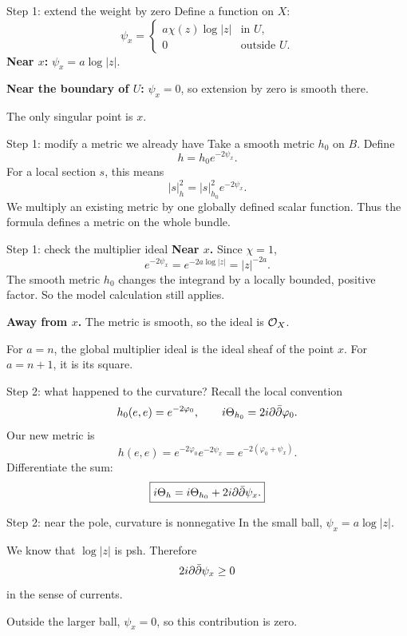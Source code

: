 \begin{frame}{Step 1: extend the weight by zero}
Define a function on \(X\):
\[
\psi_x=\begin{cases}
a\chi(z)\log|z|&\text{in }U,\\
0&\text{outside }U.
\end{cases}
\]
\textbf{Near \(x\):} \(\psi_x=a\log|z|\).
\par\medskip
\textbf{Near the boundary of \(U\):} \(\psi_x=0\), so extension by zero is smooth there.
\par\medskip
The only singular point is \(x\).
\end{frame}

\begin{frame}{Step 1: modify a metric we already have}
Take a smooth metric \(h_0\) on \(B\). Define
\[
\boxed{h=h_0e^{-2\psi_x}.}
\]
For a local section \(s\), this means
\[
|s|_h^2=|s|_{h_0}^2e^{-2\psi_x}.
\]
We multiply an existing metric by one globally defined scalar function. Thus the formula defines a metric on the whole bundle.
\end{frame}

\begin{frame}{Step 1: check the multiplier ideal}
\textbf{Near \(x\).} Since \(\chi=1\),
\[
e^{-2\psi_x}=e^{-2a\log|z|}=|z|^{-2a}.
\]
The smooth metric \(h_0\) changes the integrand by a locally bounded, positive factor. So the model calculation still applies.
\par\medskip
\textbf{Away from \(x\).} The metric is smooth, so the ideal is \(\mathcal O_X\).
\par\medskip
For \(a=n\), the global multiplier ideal is the ideal sheaf of the point \(x\). For \(a=n+1\), it is its square.
\end{frame}

\begin{frame}{Step 2: what happened to the curvature?}
Recall the local convention
\[
h_0(e,e)=e^{-2\varphi_0},\qquad i\Theta_{h_0}=2i\partial\bar\partial\varphi_0.
\]
Our new metric is
\[
h(e,e)=e^{-2\varphi_0}e^{-2\psi_x}=e^{-2(\varphi_0+\psi_x)}.
\]
Differentiate the sum:
\[
\boxed{i\Theta_h=i\Theta_{h_0}+2i\partial\bar\partial\psi_x.}
\]
\end{frame}

\begin{frame}{Step 2: near the pole, curvature is nonnegative}
In the small ball, \(\psi_x=a\log|z|\).
\par\bigskip
We know that \(\log|z|\) is psh. Therefore
\[
2i\partial\bar\partial\psi_x\ge0
\]
in the sense of currents.
\par\bigskip
Outside the larger ball, \(\psi_x=0\), so this contribution is zero.
\end{frame}

